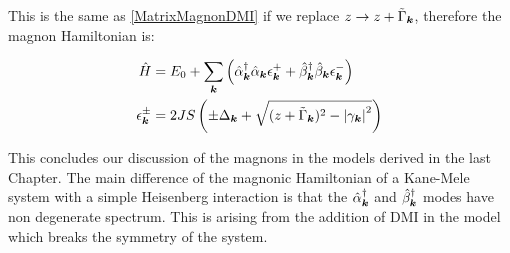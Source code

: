 This is the same as \ref{MatrixMagnonDMI} if we replace $z \rightarrow z + \tilde{\Gamma}_{\boldsymbol{k}}$, therefore the magnon Hamiltonian is:

\begin{align}
\hat{H} &= E_0 + \sum_{\boldsymbol{k}} \left( \hat{\alpha}_{\boldsymbol{k}}^\dagger \hat{\alpha}_{\boldsymbol{k}} \epsilon_{\boldsymbol{k}}^+ +\hat{\beta}_{\boldsymbol{k}}^\dagger \hat{\beta}_{\boldsymbol{k}}  \epsilon_{\boldsymbol{k}}^- \right) \\
\epsilon_{\boldsymbol{k}}^\pm &= 2JS \left( \pm \Delta_{\boldsymbol{k}} +  \sqrt{(z + \tilde{\Gamma}_{\boldsymbol{k}})^2-\abs{\gamma_{\boldsymbol{k}}}^2} \right)
\end{align}

This concludes our discussion of the magnons in the models derived in the last Chapter. The main difference of the magnonic Hamiltonian of a Kane-Mele system with a simple Heisenberg interaction is that the $\hat{\alpha}_{\boldsymbol{k}}^\dagger$ and $\hat{\beta}_{\boldsymbol{k}}^\dagger$ modes have non degenerate spectrum. This is arising from the addition of DMI in the model which breaks the symmetry of the system.


